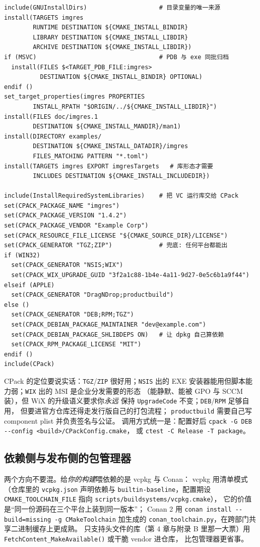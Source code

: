\documentclass[12pt,a4paper,fontset=fandol]{ctexbook}
\newcommand{\Fn}[1]{\texttt{#1()}}
\newcommand{\Tp}[1]{\texttt{#1}}
\newcommand{\Bk}{\allowbreak}
\begin{document}
\begin{lstlisting}[style=cmakestyle,caption={install 布局与 CPack 配置}]
include(GNUInstallDirs)                    # 目录变量的唯一来源
install(TARGETS imgres
        RUNTIME DESTINATION ${CMAKE_INSTALL_BINDIR}
        LIBRARY DESTINATION ${CMAKE_INSTALL_LIBDIR}
        ARCHIVE DESTINATION ${CMAKE_INSTALL_LIBDIR})
if (MSVC)                                  # PDB 与 exe 同批归档
  install(FILES $<TARGET_PDB_FILE:imgres>
          DESTINATION ${CMAKE_INSTALL_BINDIR} OPTIONAL)
endif ()
set_target_properties(imgres PROPERTIES
        INSTALL_RPATH "$ORIGIN/../${CMAKE_INSTALL_LIBDIR}")
install(FILES doc/imgres.1
        DESTINATION ${CMAKE_INSTALL_MANDIR}/man1)
install(DIRECTORY examples/
        DESTINATION ${CMAKE_INSTALL_DATADIR}/imgres
        FILES_MATCHING PATTERN "*.toml")
install(TARGETS imgres EXPORT imgresTargets   # 库形态才需要
        INCLUDES DESTINATION ${CMAKE_INSTALL_INCLUDEDIR})

include(InstallRequiredSystemLibraries)    # 把 VC 运行库交给 CPack
set(CPACK_PACKAGE_NAME "imgres")
set(CPACK_PACKAGE_VERSION "1.4.2")
set(CPACK_PACKAGE_VENDOR "Example Corp")
set(CPACK_RESOURCE_FILE_LICENSE "${CMAKE_SOURCE_DIR}/LICENSE")
set(CPACK_GENERATOR "TGZ;ZIP")             # 兜底: 任何平台都能出
if (WIN32)
  set(CPACK_GENERATOR "NSIS;WIX")
  set(CPACK_WIX_UPGRADE_GUID "3f2a1c88-1b4e-4a11-9d27-0e5c6b1a9f44")
elseif (APPLE)
  set(CPACK_GENERATOR "DragNDrop;productbuild")
else ()
  set(CPACK_GENERATOR "DEB;RPM;TGZ")
  set(CPACK_DEBIAN_PACKAGE_MAINTAINER "dev@example.com")
  set(CPACK_DEBIAN_PACKAGE_SHLIBDEPS ON)   # 让 dpkg 自己算依赖
  set(CPACK_RPM_PACKAGE_LICENSE "MIT")
endif ()
include(CPack)
\end{lstlisting}

CPack 的定位要说实话：\Tp{TGZ}/{\Bk}\Tp{ZIP} 很好用；\Tp{NSIS} 出的
EXE 安装器能用但脚本能力弱；\Tp{WIX} 出的 MSI 是企业分发需要的形态
（能静默、能被 GPO 与 SCCM 装），但 WiX 的升级语义要求你\emph{永远}
保持 \Tp{UpgradeCode} 不变；\Tp{DEB}/{\Bk}\Tp{RPM} 足够自用，
但要进官方仓库还得走发行版自己的打包流程；
\Tp{productbuild} 需要自己写 component plist 并负责签名与公证。
调用方式统一是：配置好后
\lstinline|cpack -G DEB --config <build>/CPackConfig.cmake|，
或 \lstinline|ctest -C Release -T package|。

\subsection{依赖侧与发布侧的包管理器}

两个方向不要混。给\emph{你的构建}喂依赖的是 vcpkg 与 Conan：
vcpkg 用清单模式（仓库里的 \Tp{vcpkg.json} 声明依赖与
\Tp{builtin-baseline}，配置期设
\Tp{CMAKE\Bk\_TOOLCHAIN\Bk\_FILE} 指向
\Tp{scripts\Bk/buildsystems\Bk/vcpkg.cmake}），
它的价值是``同一份源码在三个平台上装到同一版本''；
Conan 2 用 \lstinline|conan install --build=missing -g CMakeToolchain|
加生成的 \Tp{conan\_toolchain.py}，在跨部门共享二进制缓存上更成熟。
只支持头文件的库（第 4 章与附录 B 里那一大票）用
\Fn{FetchContent\_MakeAvailable} 或干脆 vendor 进仓库，
比包管理器更省事。
\end{document}
